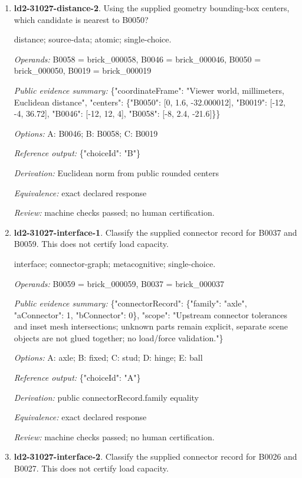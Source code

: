 \begin{enumerate}
\item \textbf{ld2-31027-distance-2}. Using the supplied geometry bounding-box centers, which candidate is nearest to B0050?
\par{\small distance; source-data; atomic; single-choice.\par\textit{Operands:} B0058 = brick\_000058, B0046 = brick\_000046, B0050 = brick\_000050, B0019 = brick\_000019\par\textit{Public evidence summary:} \{"coordinateFrame": "Viewer world, millimeters, Euclidean distance", "centers": \{"B0050": [0, 1.6, -32.000012], "B0019": [-12, -4, 36.72], "B0046": [-12, 12, 4], "B0058": [-8, 2.4, -21.6]\}\}\par\textit{Options:} A: B0046; B: B0058; C: B0019\par\textit{Reference output:} \{"choiceId": "B"\}\par\textit{Derivation:} Euclidean norm from public rounded centers\par\textit{Equivalence:} exact declared response\par\textit{Review:} machine checks passed; no human certification.}
\item \textbf{ld2-31027-interface-1}. Classify the supplied connector record for B0037 and B0059. This does not certify load capacity.
\par{\small interface; connector-graph; metacognitive; single-choice.\par\textit{Operands:} B0059 = brick\_000059, B0037 = brick\_000037\par\textit{Public evidence summary:} \{"connectorRecord": \{"family": "axle", "aConnector": 1, "bConnector": 0\}, "scope": "Upstream connector tolerances and inset mesh intersections; unknown parts remain explicit, separate scene objects are not glued together; no load/force validation."\}\par\textit{Options:} A: axle; B: fixed; C: stud; D: hinge; E: ball\par\textit{Reference output:} \{"choiceId": "A"\}\par\textit{Derivation:} public connectorRecord.family equality\par\textit{Equivalence:} exact declared response\par\textit{Review:} machine checks passed; no human certification.}
\item \textbf{ld2-31027-interface-2}. Classify the supplied connector record for B0026 and B0027. This does not certify load capacity.

\end{enumerate}
